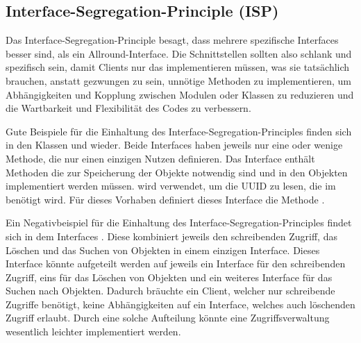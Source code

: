 \subsection{Interface-Segregation-Principle (ISP)}
Das Interface-Segregation-Principle besagt, dass mehrere spezifische Interfaces besser sind, als ein Allround-Interface. Die Schnittstellen sollten also schlank und spezifisch sein, damit Clients nur das implementieren müssen, was sie tatsächlich brauchen, anstatt gezwungen zu sein, unnötige Methoden zu implementieren, um Abhängigkeiten und Kopplung zwischen Modulen oder Klassen zu reduzieren und die Wartbarkeit und Flexibilität des Codes zu verbessern.

Gute Beispiele für die Einhaltung des Interface-Segregation-Principles finden sich in den Klassen \href{https://github.com/MichaelaHaag/RezeptApp/blob/main/1-Adapter/src/main/java/de/rezeptapp/adapter/Datenpersistenz/ICSVPersistierbar.java}{} und \href{https://github.com/MichaelaHaag/RezeptApp/tree/main/3-Domain-Code/src/main/java/de/rezeptapp/domain/IPersistierbar.java}{} wieder.
Beide Interfaces haben jeweils nur eine oder wenige Methode, die nur einen einzigen Nutzen definieren. Das Interface  enthält Methoden die zur Speicherung der Objekte notwendig sind und in den Objekten implementiert werden müssen.  wird verwendet, um die UUID zu lesen, die im  benötigt wird. Für dieses Vorhaben definiert dieses Interface die Methode .

Ein Negativbeispiel für die Einhaltung des Interface-Segregation-Principles findet sich in dem Interfaces . Diese kombiniert jeweils den schreibenden Zugriff, das Löschen und das Suchen von Objekten in einem einzigen Interface. Dieses Interface könnte aufgeteilt werden auf jeweils ein Interface für den schreibenden Zugriff, eins für das Löschen von Objekten und ein weiteres Interface für das Suchen nach Objekten. Dadurch bräuchte ein Client, welcher nur schreibende Zugriffe benötigt, keine Abhängigkeiten auf ein Interface, welches auch löschenden Zugriff erlaubt. Durch eine solche Aufteilung könnte eine Zugriffsverwaltung wesentlich leichter implementiert werden.

